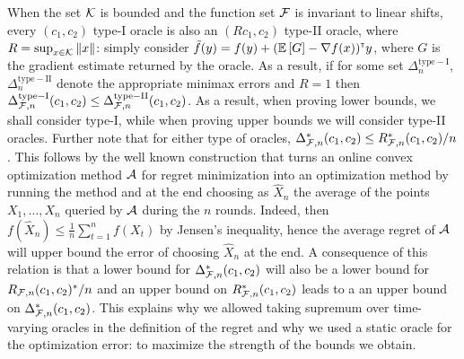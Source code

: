 When the set $\mathcal{K}$ is bounded and the function set $\mathcal{F}$ is invariant to linear shifts, every $(c_1,c_2)$ type-I oracle is also an $(R c_1,c_2)$ type-II oracle,
where $R = \sup_{x\in \mathcal{K}} \|x\|$: simply consider $\tilde{f}(y) =  f(y) + (\mathbb{E}\left[G\right]-\nabla f(x))^\mathsf{\scriptscriptstyle T} y $,
where $G$ is the gradient estimate returned by the oracle. %
As a result, if for some set $\Delta_{n}^{\mathrm{type-I}}$, $\Delta_{n}^{\mathrm{type-II}}$
denote the appropriate minimax errors and $R=1$
then $\Delta_{\mathcal{F},n}^{\mathrm{type-I}}(c_1,c_2) \le \Delta_{\mathcal{F},n}^{\mathrm{type-II}}(c_1,c_2)  $.
As a result, when proving lower bounds, we shall consider type-I, while when proving upper bounds we will consider type-II oracles.
Further note that for either type of oracles, $\Delta_{\mathcal{F},n}^*(c_1,c_2) \le R_{\mathcal{F},n}^*(c_1,c_2)/n$. This follows by the well known construction that turns an online convex optimization method $\mathcal{A}$ for regret minimization into an optimization method by running the method and at the end choosing as $\hat{X}_n$ the average of the points $X_1,\dots,X_n$ queried by $\mathcal{A}$ during the $n$ rounds.
Indeed, then $f(\hat{X}_n) \le \frac1n \sum_{t=1}^n f(X_t)$ by Jensen's inequality, hence the average regret of $\mathcal{A}$ will upper bound the error of choosing $\hat{X}_n$ at the end.
A consequence of this relation is that a lower bound for $\Delta_{\mathcal{F},n}^*(c_1,c_2) $ will also be a lower bound for $R_{\mathcal{F},n}(c_1,c_2)^*/n$ and an upper bound on $R_{\mathcal{F},n}^*(c_1,c_2)$ leads to a an upper bound on $\Delta_{\mathcal{F},n}^*(c_1,c_2)$. This explains why we allowed taking supremum over time-varying oracles in the definition of the regret and why we used a static oracle for the optimization error: to maximize the strength of the bounds we obtain.
